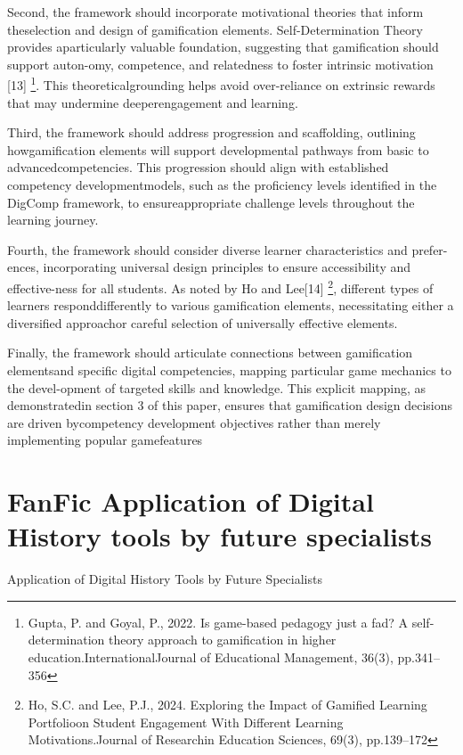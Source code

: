 Second, the framework should incorporate motivational theories that inform theselection and design of gamification elements. Self-Determination Theory provides aparticularly valuable foundation, suggesting that gamification should support auton-omy, competence, and relatedness to foster intrinsic motivation [13] \footnote{Gupta,  P. and Goyal,  P.,  2022.   Is game-based pedagogy just a fad?   A self-determination theory approach to gamification in higher education.InternationalJournal of Educational Management, 36(3), pp.341–356}. This theoreticalgrounding helps avoid over-reliance on extrinsic rewards that may undermine deeperengagement and learning.

Third, the framework should address progression and scaffolding, outlining howgamification elements will support developmental pathways from basic to advancedcompetencies. This progression should align with established competency developmentmodels, such as the proficiency levels identified in the DigComp framework, to ensureappropriate challenge levels throughout the learning journey.

Fourth, the framework should consider diverse learner characteristics and prefer-ences, incorporating universal design principles to ensure accessibility and effective-ness for all students. As noted by Ho and Lee[14] \footnote{Ho, S.C. and Lee, P.J., 2024. Exploring the Impact of Gamified Learning Portfolioon Student Engagement With Different Learning Motivations.Journal of Researchin Education Sciences, 69(3), pp.139–172}, different types of learners responddifferently to various gamification elements, necessitating either a diversified approachor careful selection of universally effective elements.

Finally, the framework should articulate connections between gamification elementsand specific digital competencies, mapping particular game mechanics to the devel-opment of targeted skills and knowledge.  This explicit mapping, as demonstratedin section 3 of this paper, ensures that gamification design decisions are driven bycompetency development objectives rather than merely implementing popular gamefeatures


\section{FanFic Application of Digital History tools by future specialists}

 Application of Digital History Tools by Future Specialists

